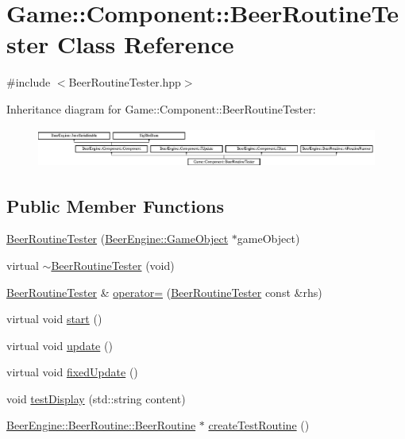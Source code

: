 \hypertarget{class_game_1_1_component_1_1_beer_routine_tester}{}\section{Game\+:\+:Component\+:\+:Beer\+Routine\+Tester Class Reference}
\label{class_game_1_1_component_1_1_beer_routine_tester}


{\ttfamily \#include $<$Beer\+Routine\+Tester.\+hpp$>$}

Inheritance diagram for Game\+:\+:Component\+:\+:Beer\+Routine\+Tester\+:\begin{figure}[H]
\begin{center}
\leavevmode
\includegraphics[height=1.297297cm]{class_game_1_1_component_1_1_beer_routine_tester}
\end{center}
\end{figure}
\subsection*{Public Member Functions}
\begin{DoxyCompactItemize}
\item 
\mbox{\hyperlink{class_game_1_1_component_1_1_beer_routine_tester_abcb7ea4145e8ef864f969c8503b0dabf}{Beer\+Routine\+Tester}} (\mbox{\hyperlink{class_beer_engine_1_1_game_object}{Beer\+Engine\+::\+Game\+Object}} $\ast$game\+Object)
\item 
virtual \mbox{\hyperlink{class_game_1_1_component_1_1_beer_routine_tester_a8be9160f8eb51946c517df27b6066fc4}{$\sim$\+Beer\+Routine\+Tester}} (void)
\item 
\mbox{\hyperlink{class_game_1_1_component_1_1_beer_routine_tester}{Beer\+Routine\+Tester}} \& \mbox{\hyperlink{class_game_1_1_component_1_1_beer_routine_tester_a9f75598140bb2e11d0d89d5b8a80f30e}{operator=}} (\mbox{\hyperlink{class_game_1_1_component_1_1_beer_routine_tester}{Beer\+Routine\+Tester}} const \&rhs)
\item 
virtual void \mbox{\hyperlink{class_game_1_1_component_1_1_beer_routine_tester_a7c721d466c33fd0a34e65707f55272a2}{start}} ()
\item 
virtual void \mbox{\hyperlink{class_game_1_1_component_1_1_beer_routine_tester_a2f14ce6211722f92a8ec5886dbeabd6c}{update}} ()
\item 
virtual void \mbox{\hyperlink{class_game_1_1_component_1_1_beer_routine_tester_a01abf9a71d6c3598a3c9a8c0d26c1615}{fixed\+Update}} ()
\item 
void \mbox{\hyperlink{class_game_1_1_component_1_1_beer_routine_tester_a08fca7a8e15f6e207f14e9ae2b984d62}{test\+Display}} (std\+::string content)
\item 
\mbox{\hyperlink{class_beer_engine_1_1_beer_routine_1_1_beer_routine}{Beer\+Engine\+::\+Beer\+Routine\+::\+Beer\+Routine}} $\ast$ \mbox{\hyperlink{class_game_1_1_component_1_1_beer_routine_tester_ad3edfa2389d65a4e11514695e9187a74}{create\+Test\+Routine}} ()
\end{DoxyCompactItemize}
